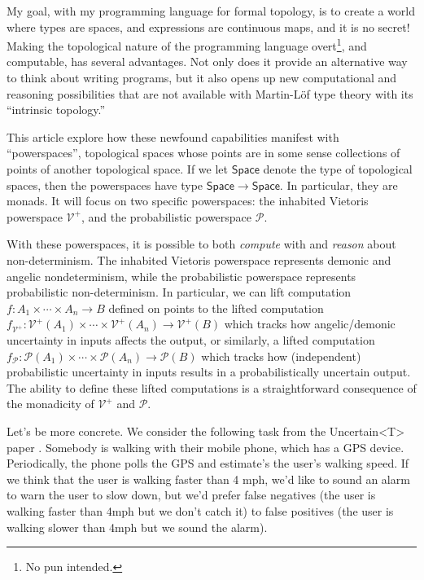 \documentclass{article}           %
\newcommand{\Space}{\mathsf{Space}}
\newcommand{\Prob}{\mathcal{P}}
\newcommand{\Viet}{{\mathcal{V}^+}}
\begin{document}
My goal, with my programming language for formal topology, is to create a world where types are spaces, and expressions are continuous maps, and it is no secret! Making the topological nature of the programming language overt\footnote{No pun intended.}, and computable, has several advantages. Not only does it provide an alternative way to think about writing programs, but it also opens up new computational and reasoning possibilities that are not available with Martin-Löf type theory with its ``intrinsic topology.''

This article explore how these newfound capabilities manifest with ``powerspaces'', topological spaces whose points are in some sense collections of points of another topological space. If we let $\Space$ denote the type of topological spaces, then the powerspaces have type $\Space \to \Space$. In particular, they are monads. It will focus on two specific powerspaces: the inhabited Vietoris powerspace $\Viet$, and the probabilistic powerspace $\Prob$.

With these powerspaces, it is possible to both \emph{compute} with and \emph{reason} about non-determinism. The inhabited Vietoris powerspace represents demonic and angelic nondeterminism, while the probabilistic powerspace represents probabilistic non-determinism. In particular, we can lift  computation $f : A_1 \times \cdots \times A_n \to B$ defined on points to the lifted computation $f_\Viet : \Viet(A_1) \times \cdots \times \Viet(A_n) \to \Viet(B)$ which tracks how angelic/demonic uncertainty in inputs affects the output, or similarly, a lifted computation $f_\Prob : \Prob(A_1) \times \cdots \times \Prob(A_n) \to \Prob(B)$ which tracks how (independent) probabilistic uncertainty in inputs results in a probabilistically uncertain output. The ability to define these lifted computations is a straightforward consequence of the monadicity of $\Viet$ and $\Prob$.

Let's be more concrete. We consider the following task from the Uncertain<T> paper \cite{uncertaint}. Somebody is walking with their mobile phone, which has a GPS device. Periodically, the phone polls the GPS and estimate's the user's walking speed. If we think that the user is walking faster than 4 mph, we'd like to sound an alarm to warn the user to slow down, but we'd prefer false negatives (the user is walking faster than 4mph but we don't catch it) to false positives (the user is walking slower than 4mph but we sound the alarm).
\end{document}
